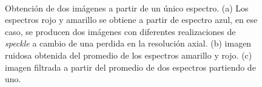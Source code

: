 \begin{figure}[h!]
	\centering
	\\
	\caption[Generación de dos imágenes a partir de un espectro]{Obtención de dos imágenes a partir de un único espectro. (a) Los espectros rojo y amarillo se obtiene a partir de espectro azul, en ese caso, se producen dos imágenes con diferentes realizaciones de \textit{speckle} a cambio de una perdida en la resolución axial. (b) imagen ruidosa obtenida del promedio de los espectros amarillo y rojo. (c) imagen filtrada a partir del promedio de dos espectros partiendo de uno.}
	\label{fig:2images_from_one_spectra}
\end{figure}



